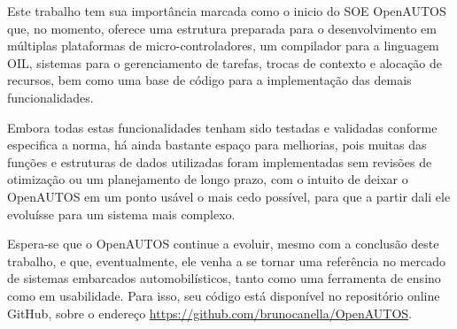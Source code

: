 \documentclass[conference,compsoc]{IEEEtran}
\begin{document}
Este trabalho tem sua importância marcada como o inicio do SOE OpenAUTOS que, no momento, oferece uma estrutura preparada para o desenvolvimento em múltiplas plataformas de micro-controladores, um compilador para a linguagem OIL, sistemas para o gerenciamento de tarefas, trocas de contexto e alocação de recursos, bem como uma base de código para a implementação das demais funcionalidades.

Embora todas estas funcionalidades tenham sido testadas e validadas conforme especifica a norma, há ainda bastante espaço para melhorias, pois muitas das funções e estruturas de dados utilizadas foram implementadas sem revisões de otimização ou um planejamento de longo prazo, com o intuito de deixar o OpenAUTOS em um ponto usável o mais cedo possível, para que a partir dali ele evoluísse para um sistema mais complexo.

Espera-se que o OpenAUTOS continue a evoluir, mesmo com a conclusão deste trabalho, e que, eventualmente, ele venha a se tornar uma referência no mercado de sistemas embarcados automobilísticos, tanto como uma ferramenta de ensino como em usabilidade. Para isso, seu código está disponível no repositório online GitHub, sobre o endereço \url{https://github.com/brunocanella/OpenAUTOS}.




\end{document}
